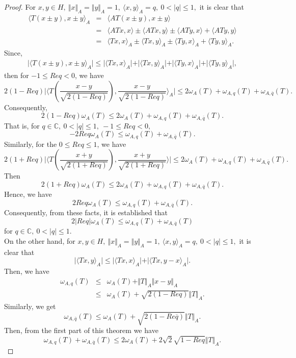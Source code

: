 \documentclass[preprint,12pt,3p]{elsarticle}
\begin{document}
\begin{proof} 
For $ x,y \in H, \ \Vert x \Vert_{A}=\Vert y \Vert_{A}=1, \ \langle x,y \rangle_{A}=q, \ 0<\vert q \vert \leq 1, $  it is clear that 
\begin{eqnarray}
\langle T(x\pm y),x\pm y \rangle_{A} & = & \langle AT(x\pm y), x\pm y \rangle \nonumber \\
& = & \langle ATx,x\rangle \pm \langle ATx,y\rangle \pm \langle ATy,x\rangle + \langle ATy,y\rangle \nonumber \\
& = & \langle Tx,x\rangle_{A} \pm \langle Tx,y\rangle_{A} \pm \langle Ty,x\rangle_{A} + \langle Ty,y\rangle_{A}. \nonumber
\end{eqnarray}
Since,
\begin{eqnarray}
\vert \langle T(x\pm y),x\pm y \rangle_{A} \vert \leq \vert\langle Tx,x\rangle_{A}\vert + \vert\langle Tx,y\rangle_{A}\vert + \vert \langle Ty,x\rangle_{A}\vert + \vert\langle Ty,y\rangle_{A}\vert , \nonumber
\end{eqnarray}
then for $ -1\leq Req<0 $, we have
$$
2(1-Req)\vert \langle T \left( \frac{x-y}{\sqrt{2(1-Req)}}\right) , \frac{x-y}{\sqrt{2(1-Req)}} \rangle_{A} \vert \leq 2\omega_{A}(T)+\omega_{A,q}(T)+ \omega_{A,\overline{q}}(T) .
$$
Consequently, 
$$
2(1-Req)\omega_{A}(T)\leq 2\omega_{A}(T) +\omega_{A,q}(T)+ \omega_{A,\overline{q}}(T).
$$
That is, for $ q\in \mathbb{C}, \ 0<\vert q \vert \leq 1, \ -1\leq Req < 0, $ 
$$
-2Req\omega_{A}(T)\leq \omega_{A,q}(T)+ \omega_{A,\overline{q}}(T).
$$
Similarly, for the $ 0\leq Req \leq 1 $, we have
$$
2(1+Req)\vert \langle T \left( \frac{x+y}{\sqrt{2(1+Req)}}\right) , \frac{x+y}{\sqrt{2(1+Req)}} \rangle \vert \leq 2\omega_{A}(T)+\omega_{A,q}(T)+ \omega_{A,\overline{q}}(T) .
$$
Then
$$
2(1+Req)\omega_{A}(T)\leq 2\omega_{A}(T) +\omega_{A,q}(T)+ \omega_{A,\overline{q}}(T).
$$
Hence, we have
$$
2Req \omega_{A}(T)\leq \omega_{A,q}(T)+ \omega_{A,\overline{q}}(T).
$$
Consequently, from these facts, it is established that 
$$
2 \vert Req \vert \omega_{A}(T)\leq \omega_{A,q}(T)+ \omega_{A,\overline{q}}(T)
$$
for $ q\in \mathbb{C}, \ 0<\vert q \vert \leq 1. $ \\
On the other hand, for $ x,y \in H, \ \Vert x \Vert_{A}=\Vert y \Vert_{A}=1, \ \langle x,y \rangle_{A}=q, \ 0<\vert q \vert \leq 1, $ it is clear that
$$
\vert \langle Tx,y \rangle_{A} \vert \leq \vert \langle Tx,x \rangle_{A} \vert + \vert \langle Tx,y-x \rangle_{A} \vert .
$$
Then, we have
\begin{eqnarray}
\omega _{A,q}(T) & \leq & \omega _{A}(T)+ \Vert T \Vert_{A} \Vert x-y \Vert_{A} \nonumber \\
& \leq &  \omega _{A}(T)+ \sqrt{2(1-Req)}\Vert T \Vert_{A} . \nonumber
\end{eqnarray}
Similarly, we get
$$
\omega _{A,\overline{q}}(T)\leq \omega _{A}(T)+ \sqrt{2(1-Re\overline{q})}\Vert T \Vert_{A}.
$$
Then, from the first part of this theorem we have 
$$
\omega _{A,q}(T)+\omega _{A,\overline{q}}(T)\leq 2\omega _{A}(T)+ 2\sqrt{2}\sqrt{1-Req}\Vert T \Vert_{A}.
$$
\end{proof}
\end{document}
